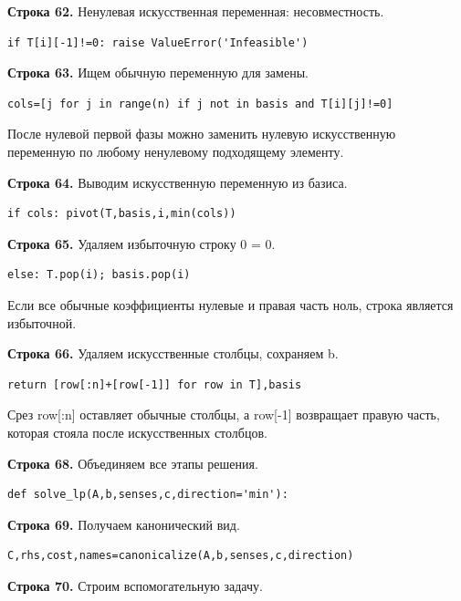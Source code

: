 \documentclass[12pt,a4paper]{article}
\begin{document}
\par\textbf{Строка 62.} Ненулевая искусственная переменная: несовместность.
\begin{Verbatim}[fontsize=\small,breaklines=true,breakanywhere=true]
            if T[i][-1]!=0: raise ValueError('Infeasible')
\end{Verbatim}
\par\textbf{Строка 63.} Ищем обычную переменную для замены.
\begin{Verbatim}[fontsize=\small,breaklines=true,breakanywhere=true]
            cols=[j for j in range(n) if j not in basis and T[i][j]!=0]
\end{Verbatim}
После нулевой первой фазы можно заменить нулевую искусственную переменную по любому ненулевому подходящему элементу.
\par\textbf{Строка 64.} Выводим искусственную переменную из базиса.
\begin{Verbatim}[fontsize=\small,breaklines=true,breakanywhere=true]
            if cols: pivot(T,basis,i,min(cols))
\end{Verbatim}
\par\textbf{Строка 65.} Удаляем избыточную строку 0 = 0.
\begin{Verbatim}[fontsize=\small,breaklines=true,breakanywhere=true]
            else: T.pop(i); basis.pop(i)
\end{Verbatim}
Если все обычные коэффициенты нулевые и правая часть ноль, строка является избыточной.
\par\textbf{Строка 66.} Удаляем искусственные столбцы, сохраняем b.
\begin{Verbatim}[fontsize=\small,breaklines=true,breakanywhere=true]
    return [row[:n]+[row[-1]] for row in T],basis
\end{Verbatim}
Срез row[:n] оставляет обычные столбцы, а row[-1] возвращает правую часть, которая стояла после искусственных столбцов.
\par\textbf{Строка 68.} Объединяем все этапы решения.
\begin{Verbatim}[fontsize=\small,breaklines=true,breakanywhere=true]
def solve_lp(A,b,senses,c,direction='min'):
\end{Verbatim}
\par\textbf{Строка 69.} Получаем канонический вид.
\begin{Verbatim}[fontsize=\small,breaklines=true,breakanywhere=true]
    C,rhs,cost,names=canonicalize(A,b,senses,c,direction)
\end{Verbatim}
\par\textbf{Строка 70.} Строим вспомогательную задачу.
\end{document}
